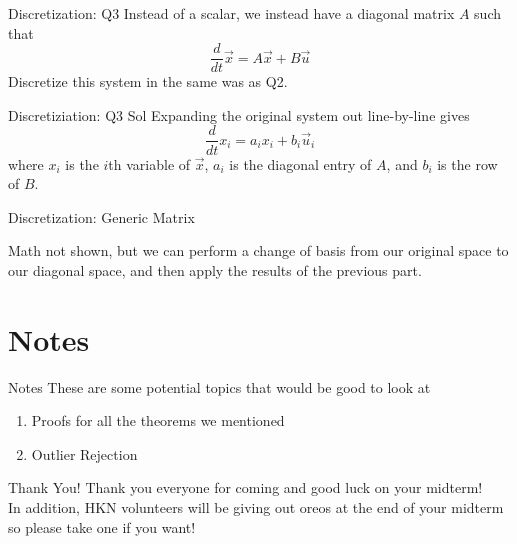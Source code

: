 \documentclass{beamer}
\begin{document}
\begin{frame}{Discretization: Q3}
Instead of a scalar, we instead have a diagonal matrix $A$ such that
\[ \frac{d}{dt} \vec{x} = A \vec{x} + B \vec{u} \]
Discretize this system in the same was as Q2.
\end{frame}

\begin{frame}{Discretiziation: Q3 Sol}
Expanding the original system out line-by-line gives
\[ \frac{d}{dt} x_i = a_i x_i + b_i \vec{u}_i \]
where $x_i$ is the $i$th variable of $\vec{x}$, $a_i$ is the diagonal entry of $A$, and $b_i$ is the row of $B$.
\end{frame}
\begin{frame}{Discretization: Generic Matrix}

Math not shown, but we can perform a change of basis from our original space to our diagonal space, and then apply the results of the previous part.

\end{frame}

\section{Notes}
\begin{frame}{Notes}
These are some potential topics that would be good to look at
\begin{enumerate}
\item Proofs for all the theorems we mentioned
\item Outlier Rejection
\end{enumerate}
\end{frame}
\begin{frame}{Thank You!}
Thank you everyone for coming and good luck on your midterm! \\ 
In addition, HKN volunteers will be giving out oreos at the end of your midterm so please take one if you want!
\end{frame}
\end{document}

